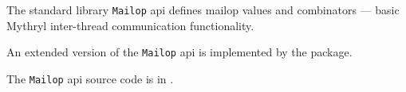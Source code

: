 
The standard library {\tt Mailop} api defines mailop values and combinators --- basic Mythryl inter-thread communication functionality.

An extended version of the {\tt Mailop} api is implemented by the  package.

The {\tt Mailop} api source code is in .






